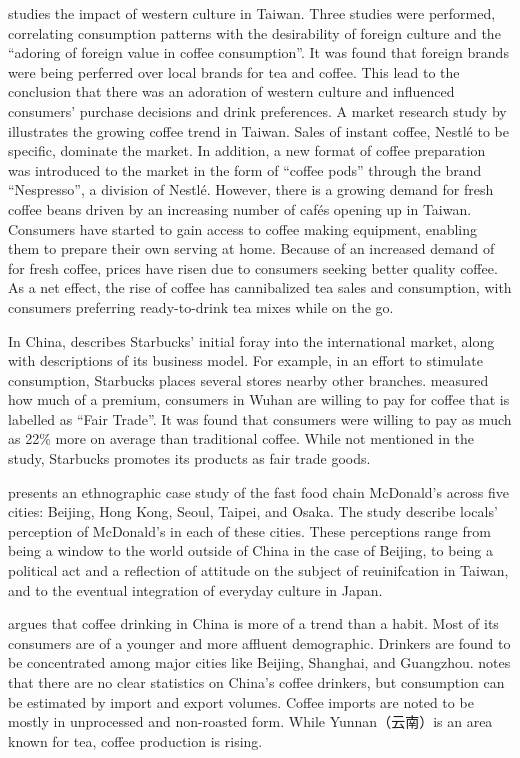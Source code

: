 \textcite{su_impact_2006} studies the impact of western culture in Taiwan. Three
studies were performed, correlating consumption patterns with the desirability
of foreign culture and the ``adoring of foreign value in coffee consumption''.
It was found that foreign brands were being perferred over local brands for tea
and coffee. This lead to the conclusion that there was an adoration of western
culture and influenced consumers' purchase decisions and drink preferences. A
market research study by \textcite{euromonitor_international_coffee_2015}
illustrates the growing coffee trend in Taiwan. Sales of instant coffee, Nestlé
to be specific, dominate the market. In addition, a new format of coffee
preparation was introduced to the market in the form of ``coffee pods'' through
the brand ``Nespresso'', a division of Nestlé. However, there is a growing
demand for fresh coffee beans driven by an increasing number of cafés opening up
in Taiwan. Consumers have started to gain access to coffee making equipment,
enabling them to prepare their own serving at home. Because of an increased
demand of for fresh coffee, prices have risen due to consumers seeking better
quality coffee. As a net effect, the rise of coffee has cannibalized tea sales
and consumption, with consumers preferring ready-to-drink tea mixes while on the
go.

In China, \textcite{harrison_exporting_2005} describes Starbucks' initial foray
into the international market, along with descriptions of its business model.
For example, in an effort to stimulate consumption, Starbucks places several
stores nearby other branches. \textcite{yang_consumer_2012} measured how much of
a premium, consumers in Wuhan are willing to pay for coffee that is labelled as
``Fair Trade''. It was found that consumers were willing to pay as much as 22\%
more on average than traditional coffee. While not mentioned in the study,
Starbucks promotes its products as fair trade goods.

\textcite{watson_golden_2006} presents an ethnographic case study of the fast
food chain McDonald's across five cities: Beijing, Hong Kong, Seoul, Taipei, and
Osaka. The study describe locals' perception of McDonald's in each of these
cities. These perceptions range from being a window to the world outside of
China in the case of Beijing, to being a political act and a reflection of
attitude on the subject of reuinifcation in Taiwan, and to the eventual
integration of everyday culture in Japan.

\textcite{zhang_coffee_2014} argues that coffee drinking in China is more of a
trend than a habit. Most of its consumers are of a younger and more affluent
demographic. Drinkers are found to be concentrated among major cities like
Beijing, Shanghai, and Guangzhou.
\textcite{international_coffee_council_coffee_2015} notes that there are no
clear statistics on China's coffee drinkers, but consumption can be estimated by
import and export volumes. Coffee imports are noted to be mostly in unprocessed
and non-roasted form. While Yunnan（云南）is an area known for tea, coffee
production is rising.

